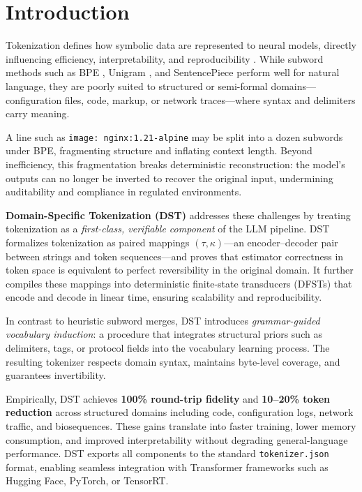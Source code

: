 \section{Introduction}
\label{sec:intro}

Tokenization defines how symbolic data are represented to neural models, directly influencing efficiency, interpretability, and reproducibility \citep{Xue2022ByT5, Ding2023ByteLevelTradeoff}.
While subword methods such as BPE \citep{Sennrich2016BPE}, Unigram \citep{Kudo2018Unigram}, and SentencePiece \citep{KudoRichardson2018SentencePiece} perform well for natural language, they are poorly suited to structured or semi-formal domains—configuration files, code, markup, or network traces—where syntax and delimiters carry meaning.

A line such as \texttt{image: nginx:1.21-alpine} may be split into a dozen subwords under BPE, fragmenting structure and inflating context length.
Beyond inefficiency, this fragmentation breaks deterministic reconstruction: the model’s outputs can no longer be inverted to recover the original input, undermining auditability and compliance in regulated environments.

\textbf{Domain-Specific Tokenization (DST)} addresses these challenges by treating tokenization as a \emph{first-class, verifiable component} of the LLM pipeline.
DST formalizes tokenization as paired mappings $(\tau,\kappa)$—an encoder–decoder pair between strings and token sequences—and proves that estimator correctness in token space is equivalent to perfect reversibility in the original domain.
It further compiles these mappings into deterministic finite-state transducers (DFSTs) that encode and decode in linear time, ensuring scalability and reproducibility.

In contrast to heuristic subword merges, DST introduces \emph{grammar-guided vocabulary induction}: a procedure that integrates structural priors such as delimiters, tags, or protocol fields into the vocabulary learning process.
The resulting tokenizer respects domain syntax, maintains byte-level coverage, and guarantees invertibility.

Empirically, DST achieves \textbf{100\% round-trip fidelity} and \textbf{10–20\% token reduction} across structured domains including code, configuration logs, network traffic, and biosequences.
These gains translate into faster training, lower memory consumption, and improved interpretability without degrading general-language performance.
DST exports all components to the standard \texttt{tokenizer.json} format, enabling seamless integration with Transformer frameworks such as Hugging Face, PyTorch, or TensorRT.

